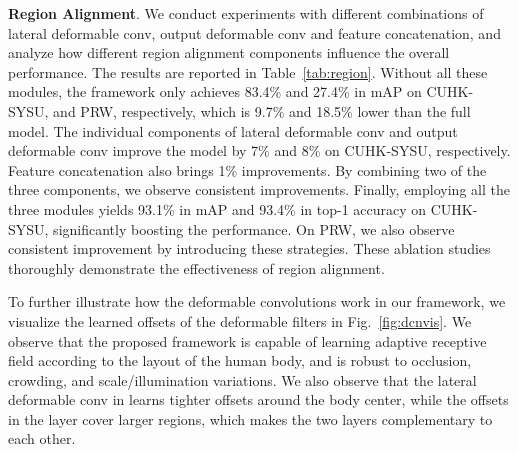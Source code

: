 \documentclass[journal]{IEEEtran}
\begin{document}
\textbf{Region Alignment}. 
We conduct experiments with different combinations of lateral deformable conv, output deformable conv and feature concatenation, and analyze how different region alignment components influence the overall performance. The results are reported in Table~\ref{tab:region}. Without all these modules, the framework only achieves 83.4\% and 27.4\% in mAP on CUHK-SYSU, and PRW, respectively, which is 9.7\% and 18.5\% lower than the full model. The individual components of lateral deformable conv and output deformable conv improve the model by 7\% and 8\% on CUHK-SYSU, respectively. Feature concatenation also brings 1\% improvements. By combining two of the three components, we observe consistent improvements. Finally, employing all the three modules yields 93.1\% in mAP and 93.4\% in top-1 accuracy on CUHK-SYSU, significantly boosting the performance. On PRW, we also observe consistent improvement by introducing these strategies. These ablation studies thoroughly demonstrate the effectiveness of region alignment.

To further illustrate how the deformable convolutions work in our framework, we visualize the learned offsets of the deformable filters in Fig.~\ref{fig:dcnvis}. We observe that the proposed framework is capable of learning adaptive receptive field according to the layout of the human body, and is robust to occlusion, crowding, and scale/illumination variations. We also observe that the lateral deformable conv in  learns tighter offsets around the body center, while the offsets in the  layer cover larger regions, which makes the two layers complementary to each other. 
\end{document}
